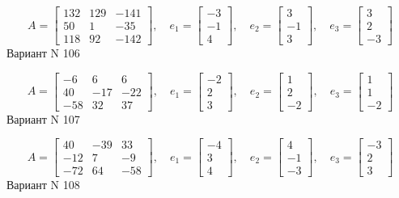 \documentclass[11pt]{report}
\begin{document}
$$A = \left[\begin{matrix}132 & 129 & -141\\50 & 1 & -35\\118 & 92 & -142\end{matrix}\right],\quad e_1 = \left[\begin{matrix}-3\\-1\\4\end{matrix}\right],\quad e_2 = \left[\begin{matrix}3\\-1\\3\end{matrix}\right],\quad e_3 = \left[\begin{matrix}3\\2\\-3\end{matrix}\right]$$Вариант N 106

$$A = \left[\begin{matrix}-6 & 6 & 6\\40 & -17 & -22\\-58 & 32 & 37\end{matrix}\right],\quad e_1 = \left[\begin{matrix}-2\\2\\3\end{matrix}\right],\quad e_2 = \left[\begin{matrix}1\\2\\-2\end{matrix}\right],\quad e_3 = \left[\begin{matrix}1\\1\\-2\end{matrix}\right]$$Вариант N 107

$$A = \left[\begin{matrix}40 & -39 & 33\\-12 & 7 & -9\\-72 & 64 & -58\end{matrix}\right],\quad e_1 = \left[\begin{matrix}-4\\3\\4\end{matrix}\right],\quad e_2 = \left[\begin{matrix}4\\-1\\-3\end{matrix}\right],\quad e_3 = \left[\begin{matrix}-3\\2\\3\end{matrix}\right]$$Вариант N 108
\end{document}
